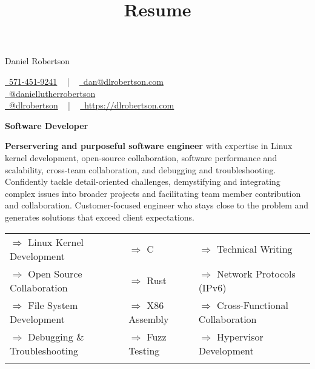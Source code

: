 \documentclass[a4paper,skipsamekey,11pt,english]{curve}
\title{Resume}
\newcommand{\allTheInfo}[3]{
  \begin{center}
    {\Huge\color{red} #1} \hfill {
      \begin{minipage}{3in}
        #2
      \end{minipage}
    }
    \vspace{10pt}
    \begin{tcolorbox}[
      sharp corners,
      boxrule=0mm,
      enhanced,
      borderline north={1pt}{0pt}{blue},
      borderline south={1pt}{0pt}{blue},
      borderline west={0pt}{0pt}{base1!10},
      borderline east={0pt}{0pt}{base1!10},
    ]
      \begin{center}
        \vspace{-5pt}
        \Large{#3}
        \vspace{-5pt}
      \end{center}
    \end{tcolorbox}
  \end{center}
}
\newcommand{\makeSkillRow}[3]{
  {$\Rightarrow$#1} & {$\Rightarrow$#2} & {$\Rightarrow$#3}\\
}
\begin{document}
  \allTheInfo{
    Daniel Robertson
  }{
    \href{tel:5714519241}{
      \raisebox{-0.05\height} \faPhone\ 571-451-9241} ~ | ~
    \href{mailto:dan@dlrobertson.com}{
      \raisebox{-0.15\height} \faEnvelope\ dan@dlrobertson.com}\\
    \href{www.linkedin.com/in/daniellutherrobertson/ }{
      \raisebox{-0.15\height} \faLinkedin\ @daniellutherrobertson }\\
    \href{https://github.com/dlrobertson}{
      \raisebox{-0.15\height} \faGithub\ @dlrobertson} ~ | ~
    \href{https://dlrobertson.com}{
      \raisebox{-0.15\height} \faGlobe\ https://dlrobertson.com}
  }{
    \color{base03}\textbf{Software Developer}
  }

  \textbf{Perservering and purposeful software engineer} with expertise in Linux kernel
  development, open-source collaboration, software performance and scalability,
  cross-team collaboration, and debugging and troubleshooting. Confidently
  tackle detail-oriented challenges, demystifying and integrating complex
  issues into broader projects and facilitating team member contribution and
  collaboration. Customer-focused engineer who stays close to the problem and
  generates solutions that exceed client expectations.
  \begin{center}
    \setlength{\tabcolsep}{1em}
    \begin{tabular}{ l l l }
      \makeSkillRow{
        Linux Kernel Development
      }{
        C
      }{
        Technical Writing
      }
      \makeSkillRow{
        Open Source Collaboration
      }{
        Rust
      }{
        Network Protocols (IPv6)
      }
      \makeSkillRow{
        File System Development
      }{
        X86 Assembly
      }{
        Cross-Functional Collaboration
      }
      \makeSkillRow{
        Debugging \& Troubleshooting
      }{
        Fuzz Testing
      }{
        Hypervisor Development
      }\\
    \end{tabular}
  \end{center}
\end{document}
